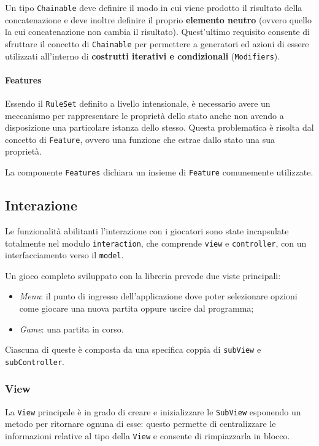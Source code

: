 Un tipo \texttt{Chainable} deve definire il modo in cui viene prodotto il risultato della concatenazione e deve inoltre definire il proprio \textbf{elemento neutro} (ovvero quello la cui concatenazione non cambia il risultato).
%
Quest'ultimo requisito consente di sfruttare il concetto di \texttt{Chainable} per permettere a generatori ed azioni di essere utilizzati all'interno di \textbf{costrutti iterativi e condizionali} (\texttt{Modifiers}).

\paragraph{Features}
Essendo il \texttt{RuleSet} definito a livello intensionale, è necessario avere un meccanismo per rappresentare le proprietà dello stato anche non avendo a disposizione una particolare istanza dello stesso.
%
Questa problematica è risolta dal concetto di \texttt{Feature}, ovvero una funzione che estrae dallo stato una sua proprietà.

La componente \texttt{Features} dichiara un insieme di \texttt{Feature} comunemente utilizzate.


\subsection{Interazione}

Le funzionalità abilitanti l'interazione con i giocatori sono state incapsulate totalmente nel modulo \texttt{interaction}, che comprende \texttt{view} e \texttt{controller}, con un interfacciamento verso il \texttt{model}.

Un gioco completo sviluppato con la libreria prevede due viste principali:
\begin{itemize}
    \item \textit{Menu}: il punto di ingresso dell'applicazione dove poter selezionare opzioni come giocare una nuova partita oppure uscire dal programma;
    \item \textit{Game}: una partita in corso.
\end{itemize}
%
Ciascuna di queste è composta da una specifica coppia di \texttt{subView} e \texttt{subController}.

\subsubsection{View}
La \texttt{View} principale è in grado di creare e inizializzare le \texttt{SubView} esponendo un metodo per ritornare ognuna di esse: questo permette di centralizzare le informazioni relative al tipo della \texttt{View} e consente di rimpiazzarla in blocco. %
